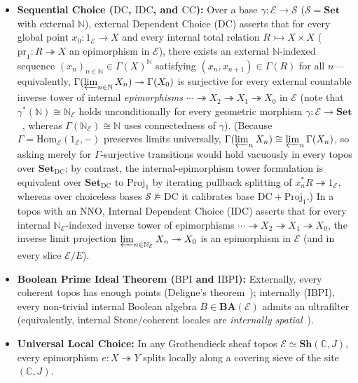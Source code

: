 \documentclass[10pt,twoside,openright]{book}
\theoremstyle{crmplain}
\theoremstyle{crmdef}
\theoremstyle{crmremark}
\begin{document}
\begin{itemize}[leftmargin=1.5em]
  \item \textbf{Sequential Choice ($\mathrm{DC}$, $\mathrm{IDC}$, and $\mathrm{CC}$):} Over a base $\gamma : \mathcal{E} \to \mathcal{S}$ ($\mathcal{S} = \mathbf{Set}$ with external $\mathbb{N}$), external Dependent Choice ($\mathrm{DC}$) asserts that for every global point $x_0 : 1_{\mathcal{E}} \to X$ and every internal total relation $R \rightarrowtail X \times X$ ($\mathrm{pr}_1 : R \twoheadrightarrow X$ an epimorphism in $\mathcal{E}$), there exists an external $\mathbb{N}$-indexed sequence $(x_n)_{n \in \mathbb{N}} \in \Gamma(X)^{\mathbb{N}}$ satisfying $(x_n, x_{n+1}) \in \Gamma(R)$ for all $n$---equivalently, $\Gamma(\varprojlim_{n \in \mathbb{N}} X_n) \twoheadrightarrow \Gamma(X_0)$ is surjective for every external countable inverse tower of internal \emph{epimorphisms} $\cdots \twoheadrightarrow X_2 \twoheadrightarrow X_1 \twoheadrightarrow X_0$ in $\mathcal{E}$ (note that $\gamma^*(\mathbb{N}) \cong \mathbb{N}_{\mathcal{E}}$ holds unconditionally for every geometric morphism $\gamma : \mathcal{E} \to \mathbf{Set}$~\cite[Prop.~A4.1.4]{Johnstone02}, whereas $\Gamma(\mathbb{N}_{\mathcal{E}}) \cong \mathbb{N}$ uses connectedness of $\gamma$). (Because $\Gamma = \mathrm{Hom}_{\mathcal{E}}(1_{\mathcal{E}}, -)$ preserves limits universally, $\Gamma(\varprojlim_n X_n) \cong \varprojlim_n \Gamma(X_n)$, so asking merely for $\Gamma$-surjective transitions would hold vacuously in every topos over $\mathbf{Set}_{\mathrm{DC}}$; by contrast, the internal-epimorphism tower formulation is equivalent over $\mathbf{Set}_{\mathrm{DC}}$ to $\mathrm{Proj}_1$ by iterating pullback splitting of $x_n^* R \twoheadrightarrow 1_{\mathcal{E}}$, whereas over choiceless bases $\mathcal{S} \not\models \mathrm{DC}$ it calibrates base $\mathrm{DC} + \mathrm{Proj}_1$.) In a topos with an $\mathrm{NNO}$, Internal Dependent Choice ($\mathrm{IDC}$) asserts that for every internal $\mathbb{N}_{\mathcal{E}}$-indexed inverse tower of epimorphisms $\cdots \twoheadrightarrow X_2 \twoheadrightarrow X_1 \twoheadrightarrow X_0$, the inverse limit projection $\varprojlim_{n \in \mathbb{N}_{\mathcal{E}}} X_n \twoheadrightarrow X_0$ is an epimorphism in $\mathcal{E}$ (and in every slice $\mathcal{E}/E$).

  \item \textbf{Boolean Prime Ideal Theorem ($\mathrm{BPI}$ and $\mathrm{IBPI}$):} Externally, every coherent topos has enough points (Deligne's theorem~\cite{Deligne72}); internally ($\mathrm{IBPI}$), every non-trivial internal Boolean algebra $B \in \mathbf{BA}(\mathcal{E})$ admits an ultrafilter (equivalently, internal Stone/coherent locales are \emph{internally spatial}~\cite{Johnstone82,Johnstone02}).

  \item \textbf{Universal Local Choice:} In any Grothendieck sheaf topos $\mathcal{E} \simeq \mathbf{Sh}(\mathbb{C}, J)$, every epimorphism $e: X \twoheadrightarrow Y$ splits locally along a covering sieve of the site $(\mathbb{C}, J)$.

\end{itemize}
\end{document}
